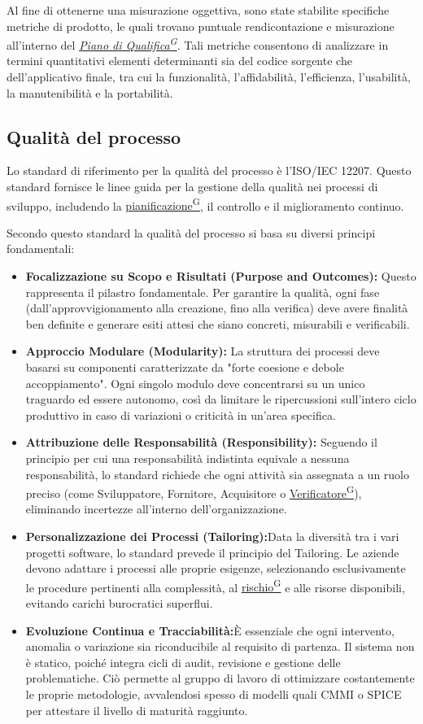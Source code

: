 \documentclass[a4paper,12pt]{article}
\providecommand{\glslink}[2]{\href{https://alittlebyte-19.github.io/Documentazione/glossario.html\#gls-#1}{\underline{#2}\textsuperscript{\scriptsize G}}}
\begin{document}
Al fine di ottenerne una misurazione oggettiva, sono state stabilite specifiche metriche di prodotto, le quali trovano puntuale rendicontazione e misurazione all'interno del \textit{\glslink{piano-di-qualifica}{Piano di Qualifica}}. Tali metriche consentono di analizzare in termini quantitativi elementi determinanti sia del codice sorgente che dell'applicativo finale, tra cui la funzionalità, l'affidabilità, l'efficienza, l'usabilità, la manutenibilità e la portabilità.

\subsection{Qualità del processo}
Lo standard di riferimento per la qualità del processo è l'ISO/IEC 12207. Questo standard fornisce le linee guida per la gestione della qualità nei processi di sviluppo, includendo la \glslink{pianificazione}{pianificazione}, il controllo e il miglioramento continuo.

Secondo questo standard la qualità del processo si basa su diversi principi fondamentali:
\begin{itemize}
    \item \textbf{Focalizzazione su Scopo e Risultati (Purpose and Outcomes):} Questo rappresenta il pilastro fondamentale. Per garantire la qualità, ogni fase (dall'approvvigionamento alla creazione, fino alla verifica) deve avere finalità ben definite e generare esiti attesi che siano concreti, misurabili e verificabili.
    \item \textbf{Approccio Modulare (Modularity):} La struttura dei processi deve basarsi su componenti caratterizzate da "forte coesione e debole accoppiamento". Ogni singolo modulo deve concentrarsi su un unico traguardo ed essere autonomo, così da limitare le ripercussioni sull'intero ciclo produttivo in caso di variazioni o criticità in un'area specifica.
    \item \textbf{Attribuzione delle Responsabilità (Responsibility):} Seguendo il principio per cui una responsabilità indistinta equivale a nessuna responsabilità, lo standard richiede che ogni attività sia assegnata a un ruolo preciso (come Sviluppatore, Fornitore, Acquisitore o \glslink{verificatore}{Verificatore}), eliminando incertezze all'interno dell'organizzazione.
    \item \textbf{Personalizzazione dei Processi (Tailoring):}Data la diversità tra i vari progetti software, lo standard prevede il principio del Tailoring. Le aziende devono adattare i processi alle proprie esigenze, selezionando esclusivamente le procedure pertinenti alla complessità, al \glslink{rischio}{rischio} e alle risorse disponibili, evitando carichi burocratici superflui.
    \item \textbf{Evoluzione Continua e Tracciabilità:}È essenziale che ogni intervento, anomalia o variazione sia riconducibile al requisito di partenza. Il sistema non è statico, poiché integra cicli di audit, revisione e gestione delle problematiche. Ciò permette al gruppo di lavoro di ottimizzare costantemente le proprie metodologie, avvalendosi spesso di modelli quali CMMI o SPICE per attestare il livello di maturità raggiunto.
\end{itemize}
\end{document}
